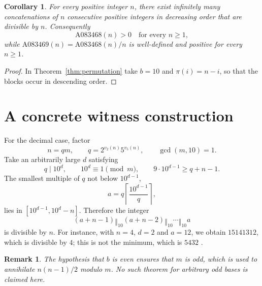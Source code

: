 \documentclass[11pt]{article}
\newtheorem{corollary}{Corollary}
\newtheorem{remark}{Remark}
\newcommand{\cat}{\mathbin{\Vert}}
\begin{document}
\begin{corollary}\label{cor:oeis}
For every positive integer $n$, there exist infinitely many
concatenations of $n$ consecutive positive integers in decreasing
order that are divisible by $n$. Consequently
\[
 \boxed{\mathrm{A083468}(n)>0\quad\text{for every }n\ge1,}
\]
while $\mathrm{A083469}(n)=\mathrm{A083468}(n)/n$ is
well-defined and positive for every $n\ge1$.
\end{corollary}
\begin{proof}
In Theorem~\ref{thm:permutation} take $b=10$ and
$\pi(i)=n-i$, so that the blocks occur in descending order.
\end{proof}
\section{A concrete witness construction}
For the decimal case, factor
\[
 n=q m,\qquad q=2^{v_2(n)}5^{v_5(n)},\qquad \gcd(m,10)=1.
\]
Take an arbitrarily large $d$ satisfying
\[
 q\mid10^d,\qquad10^d\equiv1\pmod m,\qquad
 9\cdot10^{d-1}\ge q+n-1.
\]
The smallest multiple of $q$ not below $10^{d-1}$,
\[
 a=q\left\lceil\frac{10^{d-1}}q\right\rceil,
\]
lies in $[10^{d-1},10^d-n]$. Therefore the integer
\[
 (a+n-1)\cat_{10}(a+n-2)\cat_{10}\cdots\cat_{10}a
\]
is divisible by $n$. For instance, with $n=4$, $d=2$ and $a=12$,
we obtain $15141312$, which is divisible by $4$; this is not the
minimum, which is $5432$ \cite{oeis468}.
\begin{remark}
The hypothesis that $b$ is even ensures that $m$ is odd, which is
used to annihilate $n(n-1)/2$ modulo $m$. No such theorem for arbitrary
odd bases is claimed here.
\end{remark}
\end{document}
